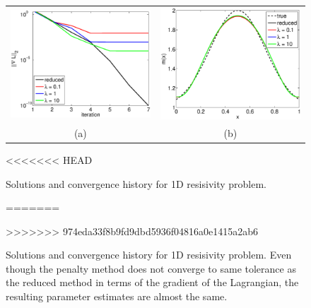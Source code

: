 \documentclass{iopart}
\begin{document}
{\begin{figure}
\centering
\begin{tabular}{cc}
\includegraphics[scale=.4]{./figs/1D_exp1_a}&
\includegraphics[scale=.4]{./figs/1D_exp1_b}\\
{\small (a)}&{\small (b)}\\
\end{tabular}
<<<<<<< HEAD
\caption{Solutions and convergence history for 1D resisivity problem.}
=======
\caption{Solutions and convergence history for 1D resisivity problem. Even though the penalty method does not converge to same tolerance as the reduced method in terms of the gradient of the Lagrangian, the resulting parameter estimates are almost the same.}
>>>>>>> 974eda33f8b9fd9dbd5936f04816a0e1415a2ab6
\label{fig:1D_exp1}
\end{figure}

}
\end{document}
